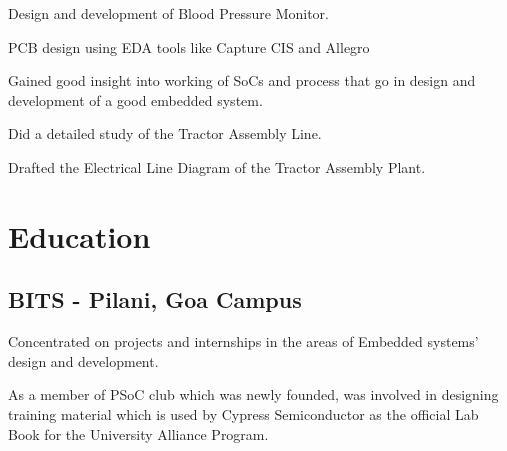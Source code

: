 \documentclass[letterpaper]{deedy-resume} %
\begin{document}
\begin{minipage}[t]{0.66\textwidth}
\sectionspace %



\begin{tightitemize}
\item Design and development of Blood Pressure Monitor.
\item PCB design using EDA tools like Capture CIS and Allegro
\item Gained good insight into working of SoCs and process that go in design and development of a good embedded system.
\end{tightitemize}

\sectionspace %



\begin{tightitemize}
\item Did a detailed study of the Tractor Assembly Line.
\item Drafted the Electrical Line Diagram of the Tractor Assembly Plant.
\end{tightitemize}

\sectionspace %


\section{Education}

\subsection{BITS - Pilani, Goa Campus}

\begin{tightitemize}
\item Concentrated on projects and internships in the areas of Embedded systems' design and development.
\item As a member of PSoC club which was newly founded, was involved in designing training material which is used by Cypress Semiconductor as the official Lab Book for the University Alliance Program.
\end{tightitemize}


\end{minipage}
\end{document}
